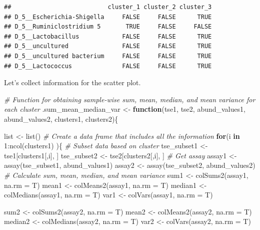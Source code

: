 \documentclass[
]{book}
\newenvironment{Shaded}{\begin{snugshade}}{\end{snugshade}}
\newcommand{\AttributeTok}[1]{\textcolor[rgb]{0.77,0.63,0.00}{#1}}
\newcommand{\CommentTok}[1]{\textcolor[rgb]{0.56,0.35,0.01}{\textit{#1}}}
\newcommand{\ControlFlowTok}[1]{\textcolor[rgb]{0.13,0.29,0.53}{\textbf{#1}}}
\newcommand{\DecValTok}[1]{\textcolor[rgb]{0.00,0.00,0.81}{#1}}
\newcommand{\FunctionTok}[1]{\textcolor[rgb]{0.00,0.00,0.00}{#1}}
\newcommand{\NormalTok}[1]{#1}
\newcommand{\OtherTok}[1]{\textcolor[rgb]{0.56,0.35,0.01}{#1}}
\newcommand{\SpecialCharTok}[1]{\textcolor[rgb]{0.00,0.00,0.00}{#1}}
\begin{document}
\begin{verbatim}
##                           cluster_1 cluster_2 cluster_3
## D_5__Escherichia-Shigella     FALSE     FALSE      TRUE
## D_5__Ruminiclostridium 5       TRUE     FALSE     FALSE
## D_5__Lactobacillus            FALSE     FALSE      TRUE
## D_5__uncultured               FALSE     FALSE      TRUE
## D_5__uncultured bacterium     FALSE     FALSE      TRUE
## D_5__Lactococcus              FALSE     FALSE      TRUE
\end{verbatim}

Let's collect information for the scatter plot.

\begin{Shaded}
\begin{Highlighting}[]
\CommentTok{\# Function for obtaining sample{-}wise sum, mean, median, and mean variance for each cluster}
\NormalTok{.sum\_mean\_median\_var }\OtherTok{\textless{}{-}} \ControlFlowTok{function}\NormalTok{(tse1, tse2, abund\_values1, abund\_values2, clusters1, clusters2)\{}
  
\NormalTok{  list }\OtherTok{\textless{}{-}} \FunctionTok{list}\NormalTok{()}
  \CommentTok{\# Create a data frame that includes all the information}
  \ControlFlowTok{for}\NormalTok{(i }\ControlFlowTok{in} \DecValTok{1}\SpecialCharTok{:}\FunctionTok{ncol}\NormalTok{(clusters1) )\{}
    \CommentTok{\# Subset data based on cluster}
\NormalTok{    tse\_subset1 }\OtherTok{\textless{}{-}}\NormalTok{ tse1[clusters1[,i], ]}
\NormalTok{    tse\_subset2 }\OtherTok{\textless{}{-}}\NormalTok{ tse2[clusters2[,i], ]}
    \CommentTok{\# Get assay}
\NormalTok{    assay1 }\OtherTok{\textless{}{-}} \FunctionTok{assay}\NormalTok{(tse\_subset1, abund\_values1)}
\NormalTok{    assay2 }\OtherTok{\textless{}{-}} \FunctionTok{assay}\NormalTok{(tse\_subset2, abund\_values2)}
    \CommentTok{\# Calculate sum, mean, median, and mean variance}
\NormalTok{    sum1 }\OtherTok{\textless{}{-}} \FunctionTok{colSums2}\NormalTok{(assay1, }\AttributeTok{na.rm =}\NormalTok{ T)}
\NormalTok{    mean1 }\OtherTok{\textless{}{-}} \FunctionTok{colMeans2}\NormalTok{(assay1, }\AttributeTok{na.rm =}\NormalTok{ T)}
\NormalTok{    median1 }\OtherTok{\textless{}{-}} \FunctionTok{colMedians}\NormalTok{(assay1, }\AttributeTok{na.rm =}\NormalTok{ T)}
\NormalTok{    var1 }\OtherTok{\textless{}{-}} \FunctionTok{colVars}\NormalTok{(assay1, }\AttributeTok{na.rm =}\NormalTok{ T)}
    
\NormalTok{    sum2 }\OtherTok{\textless{}{-}} \FunctionTok{colSums2}\NormalTok{(assay2, }\AttributeTok{na.rm =}\NormalTok{ T)}
\NormalTok{    mean2 }\OtherTok{\textless{}{-}} \FunctionTok{colMeans2}\NormalTok{(assay2, }\AttributeTok{na.rm =}\NormalTok{ T)}
\NormalTok{    median2 }\OtherTok{\textless{}{-}} \FunctionTok{colMedians}\NormalTok{(assay2, }\AttributeTok{na.rm =}\NormalTok{ T)}
\NormalTok{    var2 }\OtherTok{\textless{}{-}} \FunctionTok{colVars}\NormalTok{(assay2, }\AttributeTok{na.rm =}\NormalTok{ T)}
    

\end{Highlighting}
\end{Shaded}
\end{document}
